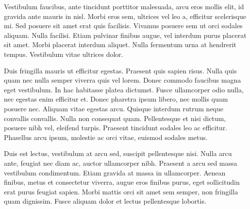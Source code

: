 Vestibulum faucibus, ante tincidunt porttitor malesuada, arcu eros mollis elit, id gravida ante mauris in nisl. Morbi eros sem, ultrices vel leo a, efficitur scelerisque mi. Sed posuere sit amet erat quis facilisis. Vivamus posuere sem ut orci sodales aliquam. Nulla facilisi. Etiam pulvinar finibus augue, vel interdum purus placerat sit amet. Morbi placerat interdum aliquet. Nulla fermentum urna at hendrerit tempus. Vestibulum vitae ultrices dolor.

Duis fringilla mauris ut efficitur egestas. Praesent quis sapien risus. Nulla quis quam nec nulla semper viverra quis vel lorem. Donec commodo faucibus magna eget vestibulum. In hac habitasse platea dictumst. Fusce ullamcorper odio nulla, nec egestas enim efficitur et. Donec pharetra ipsum libero, nec mollis quam posuere nec. Aliquam vitae egestas arcu. Quisque interdum rutrum neque convallis convallis. Nulla non consequat quam. Pellentesque et nisi dictum, posuere nibh vel, eleifend turpis. Praesent tincidunt sodales leo ac efficitur. Phasellus arcu ipsum, molestie ac orci vitae, euismod sodales metus.

Duis est lectus, vestibulum at arcu sed, suscipit pellentesque nisi. Nulla arcu ante, feugiat nec diam ac, auctor ullamcorper nibh. Praesent a arcu sed massa vestibulum condimentum. Etiam gravida at massa in ullamcorper. Aenean finibus, metus et consectetur viverra, augue eros finibus purus, eget sollicitudin erat purus feugiat sapien. Morbi mattis orci sit amet sem semper, non fringilla quam dignissim. Fusce aliquam dolor et lectus pellentesque lobortis. 

